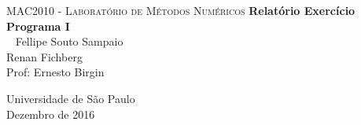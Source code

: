 \thispagestyle{empty}
\begin{center}
    \textsc
    {
        \LARGE{MAC2010 - Laboratório de Métodos Numéricos}
    }
    \vskip 3cm
    \vspace*{2.3cm}
    \textbf{\LARGE{Relatório Exercício Programa I}}\\\
    \vskip 3.5cm
    \Large{
        Fellipe Souto Sampaio \\ 
        Renan Fichberg \\
        Prof: Ernesto Birgin}
    

    \vskip 3.0cm
    \normalsize{Universidade de São Paulo \\ Dezembro de 2016}
\end{center}